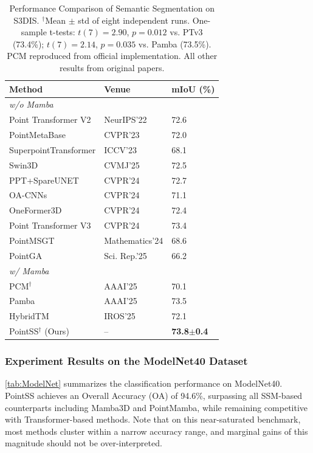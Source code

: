 \documentclass[a4paper,fleqn]{cas-sc}
\begin{document}
\begin{table}
	\centering
	\caption{Performance Comparison of Semantic Segmentation on S3DIS. $^\dagger$Mean $\pm$ std of eight independent runs. One-sample t-tests: $t(7)=2.90$, $p=0.012$ vs. PTv3 (73.4\%); $t(7)=2.14$, $p=0.035$ vs. Pamba (73.5\%). PCM reproduced from official implementation. All other results from original papers.}
	\label{tab:s3dis}
	\begin{tabular}{@{}lll@{}}
		\toprule
		\textbf{Method} & \textbf{Venue} & \textbf{mIoU (\%)} \\ \midrule
		\multicolumn{3}{l}{\textit{w/o Mamba}} \\
		Point Transformer V2\cite{ptv2} & NeurIPS'22 & 72.6 \\
		PointMetaBase\cite{pmb} & CVPR'23 & 72.0 \\
		SuperpointTransformer\cite{spt} & ICCV'23 & 68.1 \\
		Swin3D\cite{Swin3D} & CVMJ'25 & 72.5 \\
		PPT+SpareUNET\cite{ppt} & CVPR'24 & 72.7 \\
		OA-CNNs\cite{oacnn} & CVPR'24 & 71.1 \\
		OneFormer3D\cite{OneFormer3D} & CVPR'24 & 72.4 \\
		Point Transformer V3\cite{ptv3} & CVPR'24 & 73.4 \\
		PointMSGT\cite{pointmsgt} & Mathematics'24 & 68.6 \\
		PointGA\cite{pointga} & Sci. Rep.'25 & 66.2 \\ \midrule
		\multicolumn{3}{l}{\textit{w/ Mamba}} \\
		PCM$^\dagger$\cite{pcm} & AAAI'25 & 70.1 \\
		Pamba\cite{pamba} & AAAI'25 & 73.5 \\
		HybridTM\cite{hybridtm} & IROS'25 & 72.1 \\
		PointSS$^\dagger$ (Ours) & -- & \textbf{73.8$\pm$0.4} \\ \bottomrule
	\end{tabular}
\end{table}

\subsubsection{Experiment Results on the ModelNet40 Dataset}

\cref{tab:ModelNet} summarizes the classification performance on ModelNet40. PointSS achieves an Overall Accuracy (OA) of 94.6\%, surpassing all SSM-based counterparts including Mamba3D and PointMamba, while remaining competitive with Transformer-based methods. Note that on this near-saturated benchmark, most methods cluster within a narrow accuracy range, and marginal gains of this magnitude should not be over-interpreted.
\end{document}
